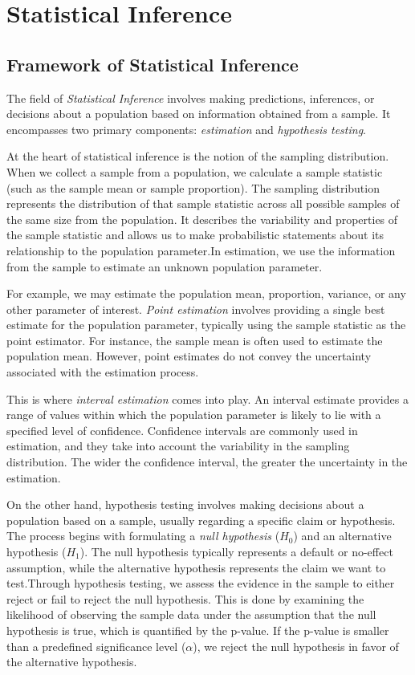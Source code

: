 \documentclass{article}
\begin{document}
\section{Statistical Inference}

\subsection{Framework of Statistical Inference}

The field of \emph{Statistical Inference} involves making predictions, inferences, or decisions about a population based on information obtained from a sample. It encompasses two primary components: \emph{estimation} and \emph{hypothesis testing}.

At the heart of statistical inference is the notion of the sampling distribution. When we collect a sample from a population, we calculate a sample statistic (such as the sample mean or sample proportion). The sampling distribution represents the distribution of that sample statistic across all possible samples of the same size from the population. It describes the variability and properties of the sample statistic and allows us to make probabilistic statements about its relationship to the population parameter.In estimation, we use the information from the sample to estimate an unknown population parameter. 

For example, we may estimate the population mean, proportion, variance, or any other parameter of interest. \emph{Point estimation} involves providing a single best estimate for the population parameter, typically using the sample statistic as the point estimator. For instance, the sample mean is often used to estimate the population mean. However, point estimates do not convey the uncertainty associated with the estimation process.

This is where \emph{interval estimation} comes into play. An interval estimate provides a range of values within which the population parameter is likely to lie with a specified level of confidence. Confidence intervals are commonly used in estimation, and they take into account the variability in the sampling distribution. The wider the confidence interval, the greater the uncertainty in the estimation.

On the other hand, hypothesis testing involves making decisions about a population based on a sample, usually regarding a specific claim or hypothesis. The process begins with formulating a \emph{null hypothesis} ($H_0$) and an alternative hypothesis ($H_1$). The null hypothesis typically represents a default or no-effect assumption, while the alternative hypothesis represents the claim we want to test.Through hypothesis testing, we assess the evidence in the sample to either reject or fail to reject the null hypothesis. This is done by examining the likelihood of observing the sample data under the assumption that the null hypothesis is true, which is quantified by the p-value. If the p-value is smaller than a predefined significance level ($\alpha$), we reject the null hypothesis in favor of the alternative hypothesis.
\end{document}
